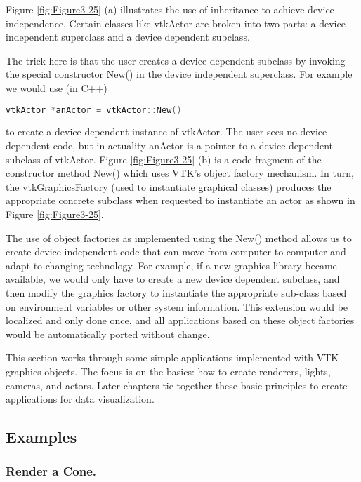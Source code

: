 Figure \ref{fig:Figure3-25} (a) illustrates the use of inheritance to achieve device independence. Certain classes like vtkActor are broken into two parts: a device independent superclass and a device dependent subclass.

\begin{samepage}
The trick here is that the user creates a device dependent
subclass by invoking the special constructor New() in the device independent superclass. For example we would use (in C++)
\begin{lstlisting}[language=C++]
vtkActor *anActor = vtkActor::New()
\end{lstlisting}
\noindent to create a device dependent instance of vtkActor. The user sees no device dependent code, but in actuality anActor is a pointer to a device dependent subclass of vtkActor. Figure \ref{fig:Figure3-25} (b) is a code fragment of the constructor method New() which uses VTK's object factory mechanism. In turn, the vtkGraphicsFactory (used to instantiate graphical classes) produces the appropriate concrete subclass when requested to instantiate an actor as shown in Figure \ref{fig:Figure3-25}.
\end{samepage}

The use of object factories as implemented using the New() method allows us to create device independent code that can move from computer to computer and adapt to changing technology. For example, if a new graphics library became available, we would only have to create a new device dependent subclass, and then modify the graphics factory to instantiate the appropriate sub-class based on environment variables or other system information. This extension would be localized and only done once, and all applications based on these object factories would be automatically ported without change.

This section works through some simple applications implemented with VTK graphics objects. The focus is on the basics: how to create renderers, lights, cameras, and actors. Later chapters tie together these basic principles to create applications for data visualization.

\subsection{Examples}
\subsubsection{Render a Cone.}

